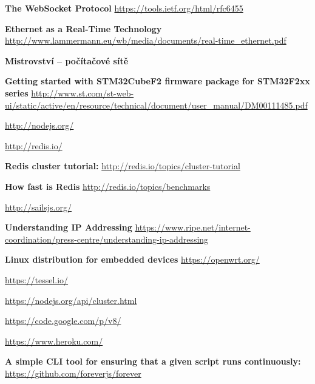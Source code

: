 \documentclass[oneside,12pt,a4paper,draft]{book} %
\begin{document}









\begin{thebibliography}{99}

 {\bf The WebSocket Protocol} \url{https://tools.ietf.org/html/rfc6455}

 {\bf Ethernet as a Real-Time Technology} \url{http://www.lammermann.eu/wb/media/documents/real-time_ethernet.pdf}

 {\bf Mistrovství – počítačové sítě}

 {\bf Getting started with STM32CubeF2 firmware package for STM32F2xx series} \url{http://www.st.com/st-web-ui/static/active/en/resource/technical/document/user_manual/DM00111485.pdf}

 \url{http://nodejs.org/}

 \url{http://redis.io/}

 {\bf Redis cluster tutorial:} \url{http://redis.io/topics/cluster-tutorial}

 {\bf How fast is Redis} \url{http://redis.io/topics/benchmarks}

 \url{http://sailsjs.org/}

 {\bf Understanding IP Addressing} \url{https://www.ripe.net/internet-coordination/press-centre/understanding-ip-addressing}

 {\bf Linux distribution for embedded devices} \url{https://openwrt.org/}

 \url{https://tessel.io/}

 \url{https://nodejs.org/api/cluster.html}

 \url{https://code.google.com/p/v8/}

 \url{https://www.heroku.com/}

 {\bf A simple CLI tool for ensuring that a given script runs continuously:} \url{https://github.com/foreverjs/forever}


\end{thebibliography}
\end{document}
